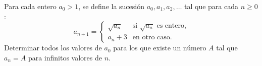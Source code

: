 Para cada entero $a_0 \gt 1$, se define la sucesión $a_0, a_1, a_2, \dots$ tal que para cada $n \ge 0$:
\[
a_{n+1} =
\begin{cases}
\sqrt{a_n} & \text{si } \sqrt{a_n} \text{ es entero,} \\
a_n + 3 & \text{en otro caso.}
\end{cases}
\]
Determinar todos los valores de $a_0$ para los que existe un número $A$ tal que $a_n = A$ para infinitos valores de $n$.
